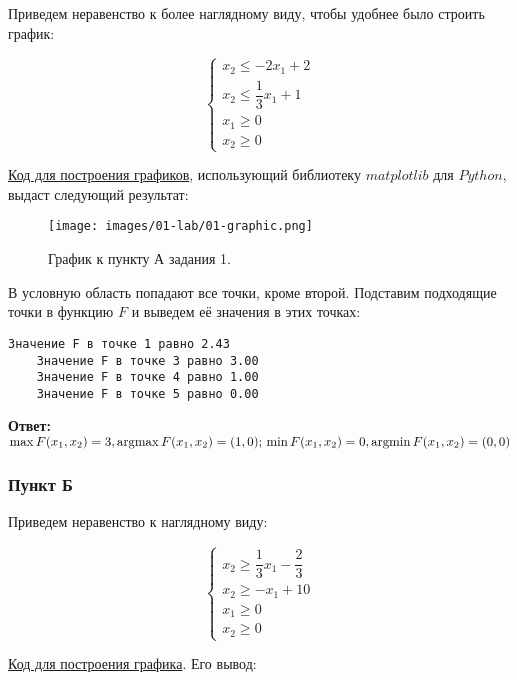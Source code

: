 Приведем неравенство к более наглядному виду, чтобы удобнее было строить график:

\[
    \begin{cases}
        x_2 \leq -2x_1 + 2           \\
        x_2 \leq \dfrac{1}{3}x_1 + 1 \\
        x_1 \geq 0                   \\
        x_2 \geq 0
    \end{cases}
\]

\href{https://github.com/retrobannerS/optimization_methods/blob/main/python/01-lab/A.%2001.py}{Код для построения графиков}, использующий библиотеку $matplotlib$ для $Python$, выдаст следующий результат:
\begin{figure}[H]
    \texttt{[image: images/01-lab/01-graphic.png]}
    \caption{График к пункту А задания 1.}
    \label{01-lab-01-graphic}
\end{figure}

В условную область попадают все точки, кроме второй. Подставим подходящие точки в функцию $F$ и выведем её значения в этих точках:

\begin{lstlisting}[language=text]
    Значение F в точке 1 равно 2.43
    Значение F в точке 3 равно 3.00
    Значение F в точке 4 равно 1.00
    Значение F в точке 5 равно 0.00
\end{lstlisting}

\textbf{Ответ:} $\max F(x_1, x_2) = 3, \operatorname*{argmax} F(x_1, x_2) = (1, 0);\\
    \min F(x_1, x_2) = 0, \operatorname*{argmin} F(x_1, x_2) = (0, 0)$ \label{01-lab-a-answer}

\subsubsection{Пункт Б}\label{01-lab-b}

Приведем неравенство к наглядному виду:

\[
    \begin{cases}
        x_2 \geq \dfrac{1}{3} x_1 - \dfrac{2}{3} \\
        x_2 \geq -x_1 + 10                       \\
        x_1 \geq 0                               \\
        x_2 \geq 0
    \end{cases}
\]

\href{https://github.com/retrobannerS/optimization_methods/blob/main/python/01-lab/B.%2001.py}{Код для построения графика}. Его вывод:

